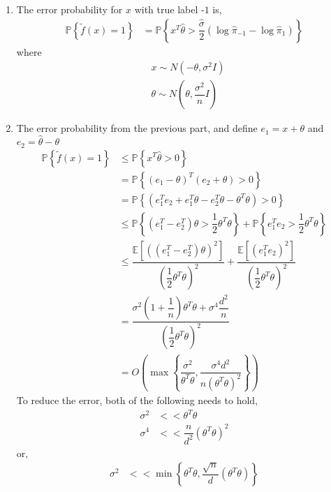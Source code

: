 \documentclass{article}
\begin{document}
\begin{enumerate}
\item The error probability for $x $ with true label -$1$ is,
\begin{align*}
\mathbb{P}\left\{\tilde{f}\left(x\right) = 1\right\} &= \mathbb{P}\left\{x^{T} \hat{\theta} > \dfrac{\hat{\sigma}}{2} \left(\log \hat{\pi}_{-1} - \log \hat{\pi}_{1}\right)\right\}
\end{align*}
where
\begin{align*}
&x  \sim  N\left(-\theta, \sigma^{2} I \right)
\\ &\theta  \sim  N\left(\theta, \dfrac{\sigma^{2}}{n} I \right)
\end{align*}
\item The error probability from the previous part, and define $e_{1} = x + \theta$ and $e_{2} = \hat{\theta} - \theta$
\begin{align*}
\mathbb{P}\left\{\tilde{f}\left(x\right) = 1\right\} &\leq  \mathbb{P}\left\{x^{T} \hat{\theta} > 0\right\}
\\ &= \mathbb{P}\left\{\left(e_{1} - \theta\right)^{T} \left(e_{2} + \theta\right) > 0\right\}
\\ &= \mathbb{P}\left\{\left(e_{1}^{T} e_{2} + e_{1}^{T} \theta - e_{2}^{T} \theta - \theta^{T} \theta\right) > 0\right\}
\\ &\leq  \mathbb{P}\left\{\left(e_{1}^{T} - e_{2}^{T}\right) \theta > \dfrac{1}{2} \theta^{T} \theta\right\} + \mathbb{P}\left\{e_{1}^{T} e_{2} > \dfrac{1}{2} \theta^{T} \theta\right\}
\\ &\leq  \dfrac{\mathbb{E}\left[\left(\left(e_{1}^{T} - e_{2}^{T}\right) \theta\right)^{2}\right]}{\left(\dfrac{1}{2} \theta^{T} \theta\right)^{2}} + \dfrac{\mathbb{E}\left[\left(e_{1}^{T} e_{2}\right)^{2}\right]}{\left(\dfrac{1}{2} \theta^{T} \theta\right)^{2}}
\\ &= \dfrac{\sigma^{2} \left(1 + \dfrac{1}{n}\right) \theta^{T} \theta + \sigma^{4} \dfrac{d^{2}}{n}}{\left(\dfrac{1}{2} \theta^{T} \theta\right)^{2}}
\\ &= O\left(\displaystyle\max\left\{\dfrac{\sigma^{2}}{\theta^{T} \theta}, \dfrac{\sigma^{4} d^{2}}{n \left(\theta^{T} \theta\right)^{2}}\right\}\right)
\end{align*}
To reduce the error, both of the following needs to hold,
\begin{align*}
\sigma^{2} &<< \theta^{T} \theta
\\ \sigma^{4} &<< \dfrac{n}{d^{2}} \left(\theta^{T} \theta\right)^{2}
\end{align*}
or,
\begin{align*}
\sigma^{2} &<< \displaystyle\min\left\{\theta^{T} \theta, \dfrac{\sqrt{n}}{d} \left(\theta^{T} \theta\right)\right\}
\end{align*}

\end{enumerate}
\end{document}
